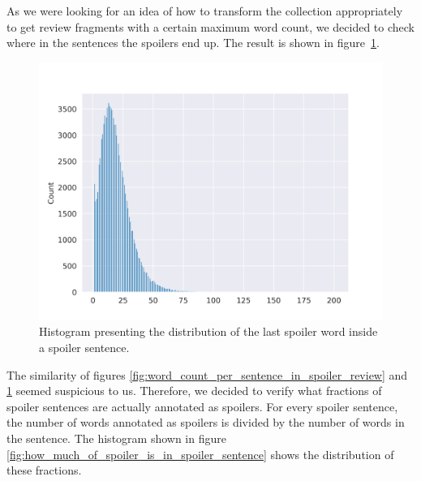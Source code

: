 \documentclass[11pt]{article}
\begin{document}
As we were looking for an idea of how to transform the collection appropriately to get review fragments with a certain maximum word count, we decided to check where in the sentences the spoilers end up. The result is shown in figure~\ref{fig:on_which_word_in_sentence_spoiler_ends}.
\begin{figure}
    \centering
    \includegraphics[width=\columnwidth]{img/eda/on_which_word_in_sentence_spoiler_ends.png}
    \caption{Histogram presenting the distribution of the last spoiler word inside a spoiler sentence.} 
    \label{fig:on_which_word_in_sentence_spoiler_ends}
\end{figure}

The similarity of figures \ref{fig:word_count_per_sentence_in_spoiler_review} and \ref{fig:on_which_word_in_sentence_spoiler_ends} seemed suspicious to us. Therefore, we decided to verify what fractions of spoiler sentences are actually annotated as spoilers. For every spoiler sentence, the number of words annotated as spoilers is divided by the number of words in the sentence. The histogram shown in figure \ref{fig:how_much_of_spoiler_is_in_spoiler_sentence} shows the distribution of these fractions.
\end{document}
